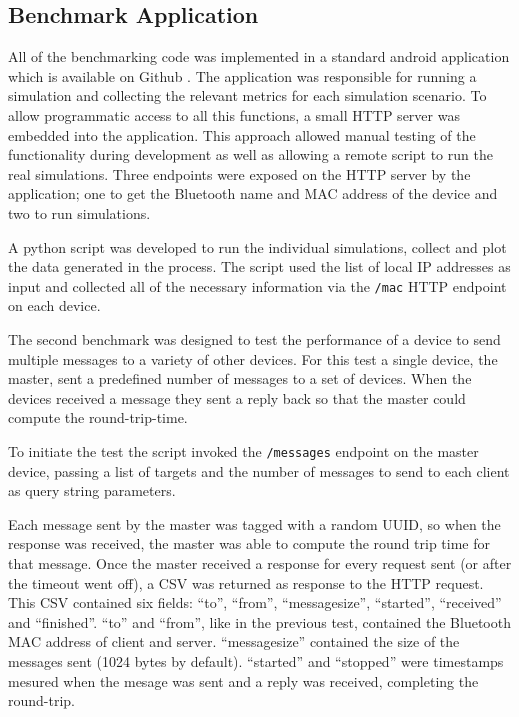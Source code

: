 
\subsection{Benchmark Application}
All of the benchmarking code was implemented in a standard android application which is available on Github \cite{benchmarking-code}.
The application was responsible for running a simulation and collecting the relevant metrics for each simulation scenario.
To allow programmatic access to all this functions, a small HTTP server \cite{nanohttpd} was embedded into the application.
This approach allowed manual testing of the functionality during development as well as allowing a remote script to run the real simulations.
Three endpoints were exposed on the HTTP server by the application; one to get the Bluetooth name and MAC address of the device and two to run simulations.

A python script was developed to run the individual simulations, collect and plot the data generated in the process.
The script used the list of local IP addresses as input and collected all of the necessary information via the \texttt{/mac} HTTP endpoint on each device.


The second benchmark was designed to test the performance of a device to send multiple messages to a variety of other devices.
For this test a single device, the master, sent a predefined number of messages to a set of devices.
When the devices received a message they sent a reply back so that the master could compute the round-trip-time.

To initiate the test the script invoked the \texttt{/messages} endpoint on the master device, passing a list of targets and the number of messages to send to each client as query string parameters.

Each message sent by the master was tagged with a random UUID, so when the response was received, the master was able to compute the round trip time for that message.
Once the master received a response for every request sent (or after the timeout went off), a CSV was returned as response to the HTTP request.
This CSV contained six fields: ``to'', ``from'', ``message\textunderscore size'', ``started'', ``received'' and ``finished''.
``to'' and ``from'', like in the previous test, contained the Bluetooth MAC address of client and server.
``message\textunderscore size'' contained the size of the messages sent (1024 bytes by default).
``started'' and ``stopped'' were timestamps mesured when the mesage was sent and a reply was received, completing the round-trip.


